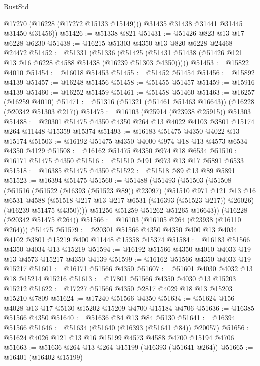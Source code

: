 \begin{lexlean}{RustStd}
\begin{coremodule}
          @17270
          (@16228 (@17272 @15133 @15149)))
        @31435
        @31438
        @31441
        @31445
        @31450
        @31456))
@51426 := @51338 @821
@51431 := @51426 @823 @13 @17 @6228 @6230
@51438 := @16215 @51303 @4350 @13 @820 @6228 @24468 @24472
@51452 := @51331
    (@51336 (@51425 (@51431 @51438 (@51426 @121 @13 @16 @6228 @4588 @51438 (@16239 @51303 @4350)))))
@51453 := @15822 @4010
@51454 := @16018 @51453
@51455 := @51452 @51454
@51456 := @15892 @4139
@51457 := @16248 @51456
@51458 := @51455 @51457
@51459 := @15916 @4139
@51460 := @16252 @51459
@51461 := @51458 @51460
@51463 := @16257 (@16259 @4010)
@51471 := @51316 (@51321 (@51461 @51463 @16643)) (@16228 (@20342 @51303 @217))
@51475 := @16103 (@25914 (@23938 @25915)) @51303
@51488 := @20301 @51475 @4350 @4350 @264 @13 @4022 @4103 @3801 @15174 @264 @11448 @15359 @15374
@51493 := @16183 @51475 @4350 @4022 @13 @15174
@51503 := @16192 @51475 @4350 @4000 @974 @18 @13 @4573 @6534 @4350 @4129
@51508 := @16162 @51475 @4350 @974 @18 @6534
@51510 := @16171 @51475 @4350
@51516 := @51510 @191 @973 @13 @17 @5891 @6533
@51518 := @16385 @51475 @4350
@51522 := @51518 @89 @13 @89 @5891
@51523 := @16394 @51475
@51560 := @51488
    (@51493
      (@51503
        (@51508
          (@51516
            (@51522 (@16393 (@51523 @89)) @23097)
            (@51510
              @971
              @121
              @13
              @16
              @6531
              @4588
              (@51518 @217 @13 @217 @6531 (@16393 (@51523 @217)) @26026)
              (@16239 @51475 @4350))))
        @51256
        @51259
        @51262
        @51265
        @16643))
    (@16228 (@20342 @51475 @264))
@51566 := @16103 (@16105 @264 (@23938 (@16110 @264))) @51475
@51579 := @20301 @51566 @4350 @4350 @400 @13 @4034 @4102 @3801 @15219 @400 @11448 @15358 @15374
@51584 := @16183 @51566 @4350 @4034 @13 @15219
@51594 := @16192 @51566 @4350 @4010 @4033 @19 @13 @4573 @15217 @4350 @4139
@51599 := @16162 @51566 @4350 @4033 @19 @15217
@51601 := @16171 @51566 @4350
@51607 := @51601 @4030 @4032 @13 @18 @15214 @15216
@51613 := @17801 @51566 @4350 @4030 @13 @15203 @15212
@51622 := @17227 @51566 @4350 @2817 @4029 @18 @13 @15203 @15210 @7809
@51624 := @17240 @51566 @4350
@51634 := @51624 @156 @4028 @13 @17 @5130 @15202 @15209 @4700 @15184 @4706
@51636 := @16385 @51566 @4350
@51640 := @51636 @84 @13 @84 @5130
@51641 := @16394 @51566
@51646 := @51634 (@51640 (@16393 (@51641 @84)) @20057)
@51656 := @51624 @4026 @121 @13 @16 @15199 @4573 @4588 @4700 @15194 @4706
@51663 := @51636 @264 @13 @264 @15199 (@16393 (@51641 @264))
@51665 := @16401 (@16402 @15199)

\end{coremodule}
\end{lexlean}
